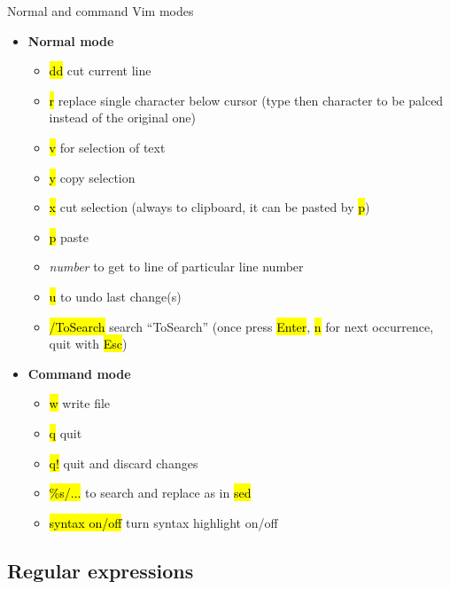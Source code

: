 \documentclass[compress, ucs, xelatex, 11pt, xcolor=svgnames,
  hyperref={
    bookmarks=true,
    unicode=true,
    colorlinks=true,
    pdftitle={Linux, command line and MetaCentrum},
    plainpages=false,
    pdfauthor={Vojtech Zeisek},
    pdfsubject={Course about use of Linux command line, writing shell scripts and using MetaCentrum of CESNET},
    pdfcreator={XeLaTeX},
    pdfkeywords={Linux, GNU, BASH, shell, command line, MetaCentrum},
    linkcolor=DarkRed,
    anchorcolor=DarkBlue,
    citecolor=Indigo,
    filecolor=NavyBlue,
    menucolor=DarkMagenta,
    urlcolor=DarkBlue,
    pdftex},
  url={hyphens, lowtilde} %
  ]{beamer}
\renewcommand{\texttt}[1]{\hl{\ttfamily #1}}
\begin{document}
\begin{frame}{Normal and command Vim modes}
  \begin{multicols}{2}
    \begin{itemize}
      \item \textbf{Normal mode}
      \begin{itemize}
	\item \texttt{dd} cut current line
	\item \texttt{r} replace single character below cursor (type then character to be palced instead of the original one)
	\item \texttt{v} for selection of text
	\item \texttt{y} copy selection
	\item \texttt{x} cut selection (always to clipboard, it can be pasted by \texttt{p})
	\item \texttt{p} paste
	\item \textit{number} to get to line of particular line number
	\item \texttt{u} to undo last change(s)
	\item \texttt{/ToSearch} search ``ToSearch'' (once press \texttt{Enter}, \texttt{n} for next occurrence, quit with \texttt{Esc})
      \end{itemize}
      \item \textbf{Command mode}
      \begin{itemize}
	\item \texttt{w} write file
	\item \texttt{q} quit
	\item \texttt{q!} quit and discard changes
	\item \texttt{\%s/...} to search and replace as in \texttt{sed}
	\item \texttt{syntax on/off} turn syntax highlight on/off
      \end{itemize}
    \end{itemize}
  \end{multicols}
\end{frame}

\subsection{Regular expressions}
\end{document}
